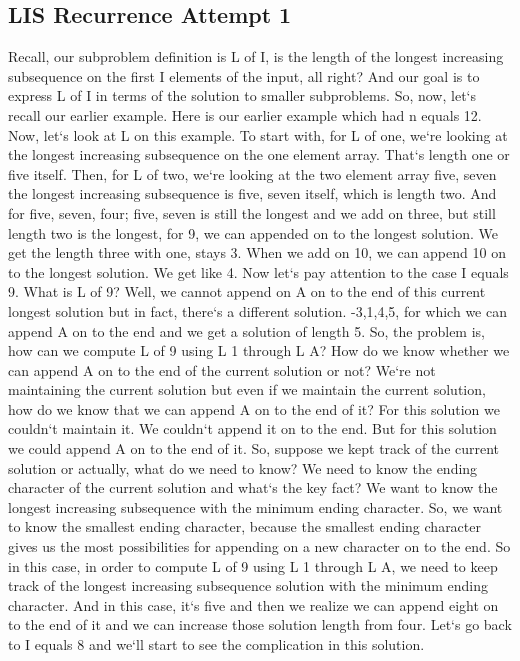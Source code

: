 \subsection{LIS  Recurrence Attempt 1}
Recall, our subproblem definition is L of I, is the length of the longest increasing subsequence on the first I elements of the input, all right? And our goal is to express L of I in terms of the solution to smaller subproblems.
So, now, let`s recall our earlier example.
Here is our earlier example which had n equals 12.
Now, let`s look at L on this example.
To start with, for L of one, we`re looking at the longest increasing subsequence on the one element array.
That`s length one or five itself.
Then, for L of two, we`re looking at the two element array five, seven the longest increasing subsequence is five, seven itself, which is length two.
And for five, seven, four; five, seven is still the longest and we add on three, but still length two is the longest, for 9, we can appended on to the longest solution.
We get the length three with one, stays 3.
When we add on 10, we can append 10 on to the longest solution.
We get like 4.
Now let`s pay attention to the case I equals 9.
What is L of 9? Well, we cannot append on A on to the end of this current longest solution but in fact, there`s a different solution. -3,1,4,5, for which we can append A on to the end and we get a solution of length 5.
So, the problem is, how can we compute L of 9 using L 1 through L A? How do we know whether we can append A on to the end of the current solution or not? We`re not maintaining the current solution but even if we maintain the current solution, how do we know that we can append A on to the end of it? For this solution we couldn`t maintain it.
We couldn`t append it on to the end.
But for this solution we could append A on to the end of it.
So, suppose we kept track of the current solution or actually, what do we need to know? We need to know the ending character of the current solution and what`s the key fact? We want to know the longest increasing subsequence with the minimum ending character.
So, we want to know the smallest ending character, because the smallest ending character gives us the most possibilities for appending on a new character on to the end.
So in this case, in order to compute L of 9 using L 1 through L A, we need to keep track of the longest increasing subsequence solution with the minimum ending character.
And in this case, it`s five and then we realize we can append eight on to the end of it and we can increase those solution length from four.
Let`s go back to I equals 8 and we`ll start to see the complication in this solution.
